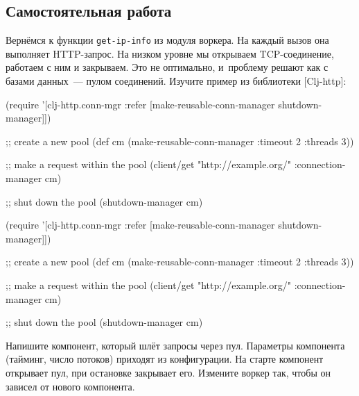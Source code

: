 \subsection{Самостоятельная работа}


Вернёмся к функции \verb|get-ip-info| из модуля воркера. На каждый вызов она
выполняет HTTP-запрос. На низком уровне мы открываем TCP-соединение, работаем с
ним и закрываем. Это не оптимально, и~проблему решают как с базами данных~---
пулом соединений. Изучите пример из библиотеки
[Clj-http]:

\ifnarrow

\begin{english}
  \begin{clojure}
(require
 '[clj-http.conn-mgr :refer
   [make-reusable-conn-manager
    shutdown-manager]])

;; create a new pool
(def cm (make-reusable-conn-manager
         {:timeout 2 :threads 3}))

;; make a request within the pool
(client/get "http://example.org/"
            {:connection-manager cm})

;; shut down the pool
(shutdown-manager cm)
  \end{clojure}
\end{english}

\else

\begin{english}
  \begin{clojure}
(require
 '[clj-http.conn-mgr :refer
   [make-reusable-conn-manager
    shutdown-manager]])

;; create a new pool
(def cm (make-reusable-conn-manager
         {:timeout 2 :threads 3}))

;; make a request within the pool
(client/get "http://example.org/"
            {:connection-manager cm})

;; shut down the pool
(shutdown-manager cm)
  \end{clojure}
\end{english}

\fi


Напишите компонент, который шлёт запросы через пул. Параметры компонента
(тайминг, число потоков) приходят из конфигурации. На старте компонент открывает
пул, при остановке закрывает его. Измените воркер так, чтобы он зависел от
нового компонента.

